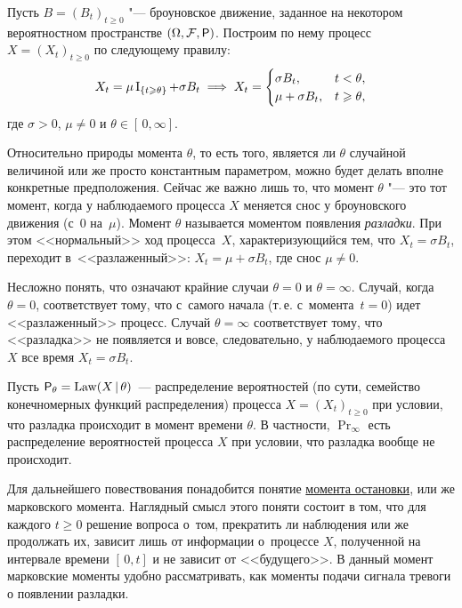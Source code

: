 Пусть \(B = (B_{t})_{t \geq 0}\) "--- броуновское движение, заданное на некотором вероятностном пространстве \((\Omega, \F, \Pr)\). 
Построим по нему процесс \(X = (X_{t})_{t \geq 0}\) по следующему правилу:
\[
	X_{t} 
	= \mu\operatorname{\mathrm{I}}_{\{t \geqslant \theta\}} + \sigma B_{t}
	\implies
	X_{t}
	= \begin{cases}
		\sigma B_{t}, & t < \theta, \\
		\mu + \sigma B_{t}, & t \geqslant \theta,
	\end{cases}
\]
где \(\sigma > 0\), \(\mu \neq 0\) и \(\theta \in [\,0, \infty]\).

Относительно природы момента \(\theta\), то есть того, является ли \(\theta\) случайной величиной или же просто константным параметром, можно будет делать вполне конкретные предположения. 
Сейчас же важно лишь то, что момент \(\theta\) "--- это тот момент, когда у наблюдаемого процесса \(X\) меняется снос у броуновского движения (с~\(0\) на~\(\mu\)). 
Момент $\theta$ называется моментом появления \emph{разладки}. 
При этом <<нормальный>> ход процесса~\(X\), характеризующийся тем, что \(X_{t} = \sigma B_{t}\), переходит
в~<<разлаженный>>: \(X_{t} = \mu + \sigma B_{t}\), где снос \(\mu \neq 0\).

Несложно понять, что означают крайние случаи \(\theta = 0\) и \(\theta = \infty\). 
Случай, когда \(\theta = 0\), соответствует тому, что с~самого начала (т.\,е. с~момента~\(t = 0\)) идет <<разлаженный>> процесс. 
Случай \(\theta = \infty\) соответствует тому, что <<разладка>> не появляется и вовсе, следовательно, у наблюдаемого процесса~\(X\) все время \(X_{t} = \sigma B_{t}\).

Пусть \(\Pr_{\theta} = \Law(X\,|\,\theta)\)~--- распределение вероятностей (по сути, семейство конечномерных функций распределения) процесса \(X = (X_{t})_{t \geq 0}\) при условии, что разладка происходит в момент времени \(\theta\). В частности, \(\Pr_{\infty}\) есть распределение вероятностей процесса \(X\) при условии, что разладка вообще не происходит.

Для дальнейшего повествования понадобится понятие \hyperref[def:markov-stopping-moment]{момента остановки}, или же марковского момента.
Наглядный смысл этого поняти состоит в том, что для каждого \(t \geq 0\) решение вопроса о~том, прекратить ли наблюдения или же продолжать их, зависит лишь от информации о~процессе \(X\), полученной на интервале времени \([\,0, t]\) и не зависит от <<будущего>>.
В данный момент марковские моменты удобно рассматривать, как моменты подачи сигнала тревоги о появлении разладки.

